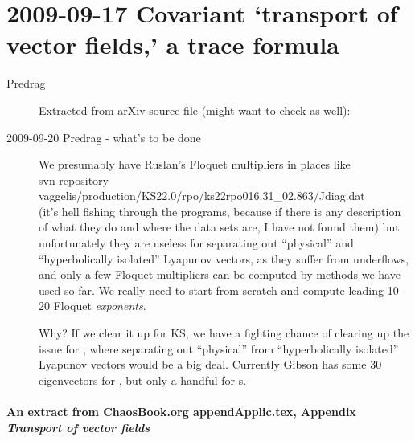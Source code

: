 \section{2009-09-17  Covariant `transport of vector fields,' a trace formula}

\begin{description}
\item[Predrag] Extracted from  arXiv source file (might want to check
 as well):



\item[2009-09-20 Predrag - what's to be done] We presumably have Ruslan's
Floquet multipliers in places like
\\
svn repository vaggelis/production/KS22.0/rpo/ks22rpo016.31\_02.863/Jdiag.dat
\\
(it's hell fishing through the programs, because if there is any description
of what they do and where the data sets are, I have not found them)
but unfortunately they are useless for separating out ``physical'' and
``hyperbolically isolated'' Lyapunov vectors, as they suffer from underflows,
and only a few Floquet multipliers can be computed by methods we have used
so far. We really need to start from scratch and
compute leading 10-20 Floquet {\em exponents}.

Why? If we clear it up for KS,
we have a fighting chance of clearing up the issue for \pCf, where
separating out ``physical'' from
``hyperbolically isolated'' Lyapunov vectors would be a big deal.
Currently Gibson has some 30 eigenvectors for \eqva, but only a handful for
\po s.


\end{description}

\paragraph{
An extract from  ChaosBook.org {appendApplic.tex}, Appendix
{\em Transport of vector fields}
          }
\renewcommand{\ssp}{x}


